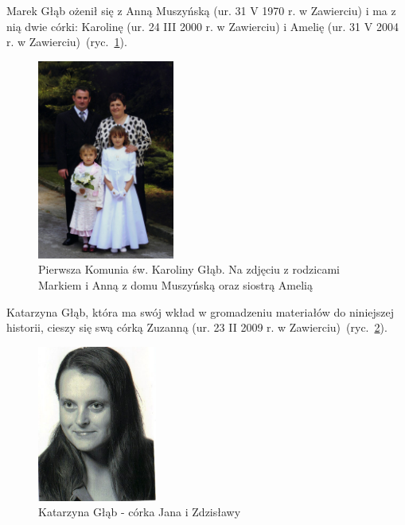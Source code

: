 Marek Głąb ożenił się z Anną Muszyńską (ur. 31 V 1970 r. w Zawierciu) i ma z nią dwie córki: Karolinę (ur. 24 III 2000 r. w Zawierciu) i Amelię (ur. 31 V 2004 r. w Zawierciu)~(ryc.~\ref{rys:marek_i_anna_glab_z_corkami}).

\begin{figure}[!h]
\begin{center}
\includegraphics[width=0.4\textwidth]{zdjecia/marek_i_anna_glab_z_corkami.jpg}
\caption[Pierwsza Komunia św. Karoliny Głąb]{Pierwsza Komunia św. Karoliny Głąb. Na zdjęciu z rodzicami Markiem i Anną z domu Muszyńską oraz siostrą Amelią}
\label{rys:marek_i_anna_glab_z_corkami}
\end{center}
\end{figure}

Katarzyna Głąb, która ma swój wkład w gromadzeniu materiałów do niniejszej historii, cieszy się swą córką Zuzanną (ur. 23 II 2009 r. w Zawierciu)~(ryc.~\ref{rys:katarzyna_glab}).

\begin{figure}[!h]
\begin{center}
\includegraphics[width=0.35\textwidth]{zdjecia/katarzyna_glab.jpg}
\caption[Katarzyna Głąb]{Katarzyna Głąb - córka Jana i Zdzisławy}
\label{rys:katarzyna_glab}
\end{center}
\end{figure}

